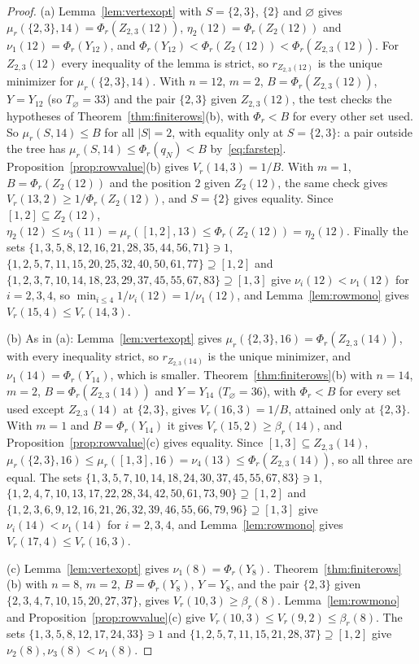 \documentclass[11pt]{article}
\begin{document}
\begin{proof}
(a) Lemma~\ref{lem:vertexopt} with $S=\{2,3\}$, $\{2\}$ and $\varnothing$
gives $\mu_r(\{2,3\},14)=\Phi_r(Z_{2,3}(12))$, $\eta_2(12)=\Phi_r(Z_2(12))$ and
$\nu_1(12)=\Phi_r(Y_{12})$, and $\Phi_r(Y_{12})<\Phi_r(Z_2(12))<\Phi_r(Z_{2,3}(12))$.
For $Z_{2,3}(12)$ every inequality of the lemma is strict, so
$r_{Z_{2,3}(12)}$ is the unique minimizer for $\mu_r(\{2,3\},14)$.
With $n=12$, $m=2$, $B=\Phi_r(Z_{2,3}(12))$, $Y=Y_{12}$ (so
$T_\varnothing=33$) and the pair $\{2,3\}$ given $Z_{2,3}(12)$, the test checks
the hypotheses of Theorem~\ref{thm:finiterows}(b), with $\Phi_r<B$ for every
other set used.  So $\mu_r(S,14)\le B$ for all $|S|=2$, with equality only
at $S=\{2,3\}$: a pair outside the tree has $\mu_r(S,14)\le\Phi_r(q_N)<B$
by~\eqref{eq:farstep}.  Proposition~\ref{prop:rowvalue}(b) gives
$V_r(14,3)=1/B$.  With $m=1$, $B=\Phi_r(Z_2(12))$ and the position $2$ given
$Z_2(12)$, the same check gives $V_r(13,2)\ge1/\Phi_r(Z_2(12))$, and $S=\{2\}$ gives
equality.  Since $[1,2]\subseteq Z_2(12)$,
$\eta_2(12)\le\nu_3(11)=\mu_r([1,2],13)\le\Phi_r(Z_2(12))=\eta_2(12)$.  Finally
the sets $\{1,3,5,8,12,16,21,28,35,44,56,71\}\ni1$,
$\{1,2,5,7,11,15,20,25,32,40,50,61,77\}\supseteq[1,2]$ and
$\{1,2,3,7,10,14,18,23,29,37,45,55,67,83\}\supseteq[1,3]$ give
$\nu_i(12)<\nu_1(12)$ for $i=2,3,4$, so
$\min_{i\le4}1/\nu_i(12)=1/\nu_1(12)$, and Lemma~\ref{lem:rowmono} gives
$V_r(15,4)\le V_r(14,3)$.

(b) As in (a): Lemma~\ref{lem:vertexopt} gives
$\mu_r(\{2,3\},16)=\Phi_r(Z_{2,3}(14))$, with every inequality strict, so
$r_{Z_{2,3}(14)}$ is the unique minimizer, and $\nu_1(14)=\Phi_r(Y_{14})$, which is
smaller.  Theorem~\ref{thm:finiterows}(b) with $n=14$, $m=2$,
$B=\Phi_r(Z_{2,3}(14))$ and $Y=Y_{14}$ ($T_\varnothing=36$), with $\Phi_r<B$
for every set used except $Z_{2,3}(14)$ at $\{2,3\}$, gives $V_r(16,3)=1/B$,
attained only at $\{2,3\}$.  With $m=1$ and $B=\Phi_r(Y_{14})$ it gives
$V_r(15,2)\ge\beta_r(14)$, and Proposition~\ref{prop:rowvalue}(c) gives
equality.  Since $[1,3]\subseteq Z_{2,3}(14)$,
$\mu_r(\{2,3\},16)\le\mu_r([1,3],16)=\nu_4(13)\le\Phi_r(Z_{2,3}(14))$, so all
three are equal.  The sets $\{1,3,5,7,10,14,18,24,30,37,45,55,67,83\}\ni1$,
$\{1,2,4,7,10,13,17,22,28,34,42,50,61,73,90\}\supseteq[1,2]$ and
$\{1,2,3,6,9,12,16,21,26,32,39,46,55,66,79,96\}\supseteq[1,3]$ give
$\nu_i(14)<\nu_1(14)$ for $i=2,3,4$, and Lemma~\ref{lem:rowmono} gives
$V_r(17,4)\le V_r(16,3)$.

(c) Lemma~\ref{lem:vertexopt} gives $\nu_1(8)=\Phi_r(Y_8)$.
Theorem~\ref{thm:finiterows}(b) with $n=8$, $m=2$, $B=\Phi_r(Y_8)$, $Y=Y_8$,
and the pair $\{2,3\}$ given $\{2,3,4,7,10,15,20,27,37\}$, gives
$V_r(10,3)\ge\beta_r(8)$.  Lemma~\ref{lem:rowmono} and
Proposition~\ref{prop:rowvalue}(c) give
$V_r(10,3)\le V_r(9,2)\le\beta_r(8)$.  The sets
$\{1,3,5,8,12,17,24,33\}\ni1$ and $\{1,2,5,7,11,15,21,28,37\}\supseteq[1,2]$
give $\nu_2(8),\nu_3(8)<\nu_1(8)$.
\end{proof}
\end{document}
